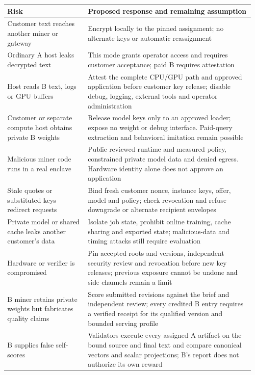 \begin{longtable}{@{}>{\raggedright\arraybackslash}p{}>{\raggedright\arraybackslash}p{}@{}}
\toprule
Risk & Proposed response and remaining assumption \\
\midrule
\endhead
\bottomrule
\endfoot
Customer text reaches another miner or gateway & Encrypt locally to the
pinned assignment; no alternate keys or automatic reassignment \\
Ordinary A host leaks decrypted text & This mode grants operator access
and requires customer acceptance; paid B requires attestation \\
Host reads B text, logs or GPU buffers & Attest the complete
CPU/GPU path and approved application before customer key release;
disable debug, logging, external tools and operator administration \\
Customer or separate compute host obtains private B weights & Release
model keys only to an approved loader; expose no weight or debug interface.
Paid-query extraction and behavioral imitation remain possible \\
Malicious miner code runs in a real enclave & Public reviewed runtime and
measured policy, constrained private model data and denied egress.
Hardware identity alone does not approve an application \\
Stale quotes or substituted keys redirect requests & Bind fresh
customer nonce, instance keys, offer, model and policy; check revocation
and refuse downgrade or alternate recipient envelopes \\
Private model or shared cache leaks another customer's data & Isolate
job state, prohibit online training, cache sharing and exported state;
malicious-data and timing attacks still require evaluation \\
Hardware or verifier is compromised & Pin accepted roots and versions,
independent security review and revocation before new key releases;
previous exposure cannot be undone and side channels remain a limit \\
B miner retains private weights but fabricates quality claims & Score
submitted revisions against the brief and independent review; every
credited B entry requires a verified receipt for its qualified version
and bounded serving profile \\
B supplies false self-scores & Validators execute every assigned A
artifact on the bound source and final text and compare canonical vectors
and scalar projections; B's report does not authorize its own reward \\

\end{longtable}
